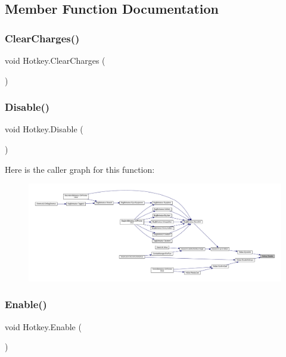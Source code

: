\subsection{Member Function Documentation}
\mbox{\label{class_hotkey_a7d290d1777e2971d3bbf99d23322d4af}} 
\subsubsection{\texorpdfstring{ClearCharges()}{ClearCharges()}}
{\footnotesize\ttfamily void Hotkey.\+Clear\+Charges (\begin{DoxyParamCaption}{ }\end{DoxyParamCaption})}

\mbox{\label{class_hotkey_a0b90f1841f8cbe70bf62447affd70bd1}} 
\subsubsection{\texorpdfstring{Disable()}{Disable()}}
{\footnotesize\ttfamily void Hotkey.\+Disable (\begin{DoxyParamCaption}{ }\end{DoxyParamCaption})}

Here is the caller graph for this function\+:
\nopagebreak
\begin{figure}[H]
\begin{center}
\leavevmode
\includegraphics[width=350pt]{class_hotkey_a0b90f1841f8cbe70bf62447affd70bd1_icgraph}
\end{center}
\end{figure}
\mbox{\label{class_hotkey_ae078d4716dbd3a3c703a3ef341e56562}} 
\subsubsection{\texorpdfstring{Enable()}{Enable()}}
{\footnotesize\ttfamily void Hotkey.\+Enable (\begin{DoxyParamCaption}{ }\end{DoxyParamCaption})}

